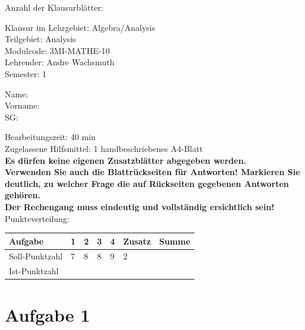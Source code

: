 \documentclass[12pt]{article}
\begin{document}
\thispagestyle{firstpage}

\begin{flushright}
Anzahl der Klausurblätter: \pageref*{LastTask}
\end{flushright}

Klausur im Lehrgebiet: Algebra/Analysis\\

Teilgebiet: Analysis \\

Modulcode: 3MI-MATHE-10 \\

Lehrender: Andre Wachsmuth \\

Semester: 1 \\

\begin{vwcol}[widths={0.4,0.4,0.2},sep=0cm, justify=flush,rule=0pt,indent=4em]
Name:\\
Vorname:\\
SG:
\end{vwcol}

\bigskip
\bigskip
\bigskip
Bearbeitungszeit: 40 min \\

Zugelassene Hilfsmittel: 1 handbeschriebenes A4-Blatt \\

\textbf{Es dürfen keine eigenen Zusatzblätter abgegeben werden.} \\

\textbf{Verwenden Sie auch die Blattrückseiten für Antworten! Markieren Sie deutlich, zu welcher Frage die auf Rückseiten gegebenen Antworten gehören.} \\

\textbf {Der Rechengang muss eindeutig und vollständig ersichtlich sein!} \\

Punkteverteilung:

\bigskip

\begin{tabularx}{\textwidth}{l|Y|Y|Y|Y|Y|Y}
Aufgabe        & 1 & 2 & 3 & 4  & Zusatz & Summe \\ [1ex] \hline
Soll-Punktzahl & 7 & 8 & 8 & 9 & 2      &       \\ [3ex]
Ist-Punktzahl  &   &   &   &    &        &       \\ [3ex]
\end{tabularx}

\newpage
\section* {Aufgabe 1}
\end{document}
